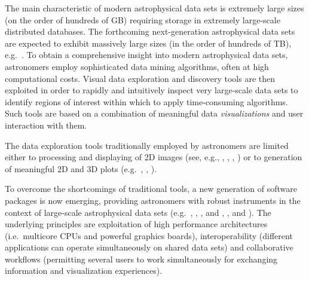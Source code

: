 \documentclass[1p,times]{elsarticle}
\begin{document}
The main characteristic of modern astrophysical data sets is extremely large
sizes (on the order of hundreds of GB) requiring storage in extremely
large-scale distributed databases. The forthcoming next-generation astrophysical 
data sets are expected to exhibit massively large sizes (in the order of hundreds
of TB), e.g.\ \cite{lsst}.
To obtain a comprehensive insight into modern astrophysical data sets, astronomers
employ sophisticated data mining algorithms, often at high computational costs. 
Visual data exploration and discovery tools are then exploited in order to rapidly 
and intuitively inspect very large-scale data sets to identify regions of interest
within which to apply time-consuming algorithms. Such tools are based on a 
combination of meaningful data {\it visualizations} and user interaction with them.  


The data exploration tools traditionally employed by astronomers 
are limited either 
to processing and displaying of 2D images (see, e.g., \cite{iraf},
\cite{midas}, \cite{sao},
\cite{gaia}) or to
generation of meaningful 2D and 3D plots (e.g.\ \cite{gnuplot},
\cite{supermongo}, \cite{idl}).
 

To overcome the shortcomings of traditional tools, a new generation of software 
packages is now emerging, providing astronomers with robust instruments in the context 
of large-scale astrophysical data sets (e.g.\ \cite{paraview}, \cite{aladin},
\cite{topcat}, \cite{visivo1} and \cite{visivo2}, 
\cite{3dslicer}, \cite{splash} and \cite{visit}). 
The underlying principles are exploitation of high performance architectures 
(i.e.\ multicore CPUs and powerful graphics boards), interoperability
(different applications can operate simultaneously on
shared data sets) and collaborative workflows (permitting several users to
work simultaneously for exchanging information and visualization experiences).
\end{document}
